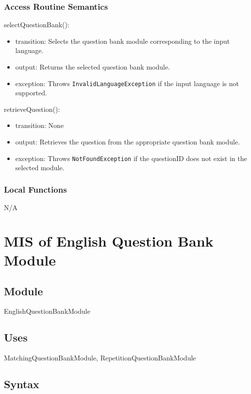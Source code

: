 \documentclass[12pt, titlepage]{article}
\begin{document}
\subsubsection{Access Routine Semantics}

\noindent selectQuestionBank():
\begin{itemize}
\item transition: Selects the question bank module corresponding to the input language.
\item output: Returns the selected question bank module.
\item exception: Throws \texttt{InvalidLanguageException} if the input language is not supported.
\end{itemize}

\noindent retrieveQuestion():
\begin{itemize}
\item transition: None
\item output: Retrieves the question from the appropriate question bank module.
\item exception: Throws \texttt{NotFoundException} if the questionID does not exist in the selected module.
\end{itemize}

\subsubsection{Local Functions}

N/A

\section{MIS of English Question Bank Module} \label{EnglishQuestionBankModule}

\subsection{Module}

EnglishQuestionBankModule

\subsection{Uses}

MatchingQuestionBankModule, RepetitionQuestionBankModule

\subsection{Syntax}
\end{document}
